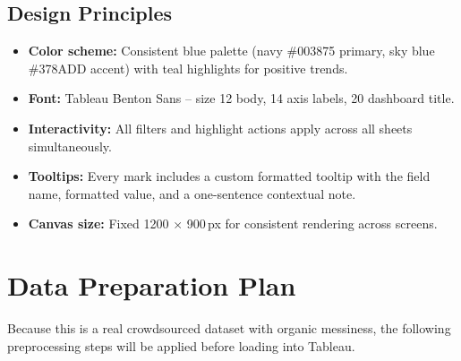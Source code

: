 \documentclass[12pt,a4paper]{article}
\begin{document}
\subsection{Design Principles}

\begin{itemize}[leftmargin=2em, itemsep=4pt]
  \item \textbf{Color scheme:} Consistent blue palette (navy \#003875 primary, sky blue \#378ADD accent) with teal highlights for positive trends.
  \item \textbf{Font:} Tableau Benton Sans -- size 12 body, 14 axis labels, 20 dashboard title.
  \item \textbf{Interactivity:} All filters and highlight actions apply across all sheets simultaneously.
  \item \textbf{Tooltips:} Every mark includes a custom formatted tooltip with the field name, formatted value, and a one-sentence contextual note.
  \item \textbf{Canvas size:} Fixed 1200 $\times$ 900\,px for consistent rendering across screens.
\end{itemize}

\section{Data Preparation Plan}

Because this is a real crowdsourced dataset with organic messiness, the following
preprocessing steps will be applied before loading into Tableau.
\end{document}
